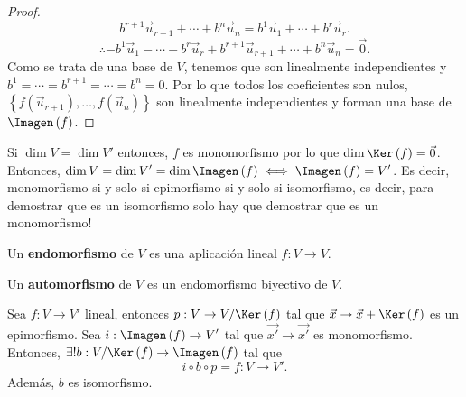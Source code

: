 \begin{proof}
\[b^{r+1}\vec{u}_{r+1} + \cdots + b^{n}\vec{u}_{n} = b^{1}\vec{u}_{1} + \cdots + b^{r}\vec{u}_{r} .\]
\[\therefore -b^{1}\vec{u}_{1} - \cdots - b^{r}\vec{u}_{r} + b^{r+1}\vec{u}_{r+1} + \cdots + b^{n}\vec{u}_{n} = \vec{0} .\]
Como se trata de una base de $\displaystyle V $, tenemos que son linealmente independientes y $\displaystyle b^{1} = \cdots = b^{r+1} = \cdots = b^{n} = 0 $. Por lo que todos los coeficientes son nulos, $\displaystyle \left\{ f\left(\vec{u}_{r+1}\right), \ldots, f\left(\vec{u}_{n}\right)\right\}  $ son linealmente independientes y forman una base de $\displaystyle \Imagen\left(f\right) $.
\end{proof}

\begin{observation}
\normalfont Si $\displaystyle \dim V = \dim V' $ entonces, $\displaystyle f $ es monomorfismo por lo que $\displaystyle \dim \Ker\left(f\right) = \vec{0} $. Entonces, $\displaystyle \dim V = \dim V'= \dim \Imagen\left(f\right) \iff \Imagen\left(f\right) = V' $. Es decir, monomorfismo si y solo si epimorfismo si y solo si isomorfismo, es decir, para demostrar que es un isomorfismo solo hay que demostrar que es un monomorfismo!
\end{observation}

\begin{fdefinition}[Endomorfismo]
\normalfont Un \textbf{endomorfismo} de $\displaystyle V $ es una aplicación lineal $\displaystyle f: V \to V $. 
\end{fdefinition}

\begin{fdefinition}[Automorfismo]
\normalfont Un \textbf{automorfismo}  de $\displaystyle V $ es un endomorfismo biyectivo de $\displaystyle V $.
\end{fdefinition}

\begin{ftheorem}[]
\normalfont Sea $\displaystyle f: V \to V' $ lineal, entonces $\displaystyle p : V \to V/\Ker\left(f\right) $ tal que $\displaystyle \vec{x} \to \vec{x} + \Ker\left(f\right) $ es un epimorfismo. Sea $\displaystyle i : \Imagen\left(f\right) \to V' $ tal que $\displaystyle \vec{x'} \to \vec{x'} $  es monomorfismo. Entonces, $\displaystyle \exists! b : V/\Ker\left(f\right) \to \Imagen\left(f\right) $ tal que 
\[i \circ b \circ p = f: V \to V' .\]
Además, $\displaystyle b $ es isomorfismo.
\end{ftheorem}

